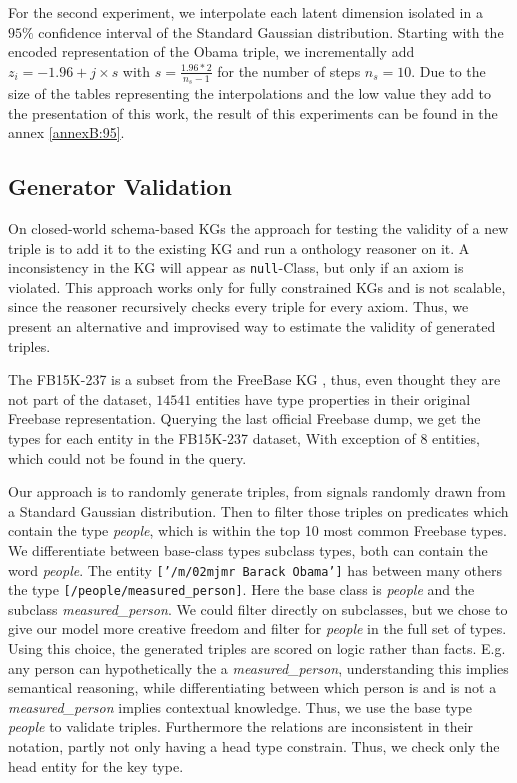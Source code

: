 For the second experiment, we interpolate each latent dimension isolated in a $95\%$ confidence interval of the Standard Gaussian distribution. Starting with the encoded representation of the Obama triple, we incrementally add $z_{i} = -1.96 + j \times s$ with $s = \frac{1.96 * 2}{n_s-1}$ for the number of steps $n_s = 10$. Due to the size of the tables representing the interpolations and the low value they add to the presentation of this work, the result of this experiments can be found in the annex \ref{annexB:95}.





\subsection{Generator Validation}
\label{ssec5:syntax}

On closed-world schema-based KGs the approach for testing the validity of a new triple is to add it to the existing KG and run a onthology reasoner on it. A inconsistency in the KG will appear as \texttt{null}-Class, but only if an axiom is violated. This approach works only for fully constrained KGs and is not scalable, since the reasoner recursively checks every triple for every axiom. Thus, we present an alternative and improvised way to estimate the validity of generated triples.

The FB15K-237 is a subset from the FreeBase KG \cite{bollacker_freebase_2008}, thus, even thought they are not part of the dataset, $14541$ entities have type properties in their original Freebase representation. 
Querying the last official Freebase dump, we get the types for each entity in the FB15K-237 dataset, With exception of $8$ entities, which could not be found in the query.

Our approach is to randomly generate triples, from signals randomly drawn from a Standard Gaussian distribution. Then to filter those triples on predicates which contain the type \textit{people}, which is within the top 10 most common Freebase types. We differentiate between base-class types subclass types, both can contain the word \textit{people}. The entity \texttt{['/m/02mjmr Barack Obama']} has between many others the type \texttt{[/people/measured\_person]}. Here the base class is \textit{people} and the subclass \textit{measured\_person}. We could filter directly on subclasses, but we chose to give our model more creative freedom and filter for \textit{people} in the full set of types. Using this choice, the generated triples are scored on logic rather than facts. E.g. any person can hypothetically the a \textit{measured\_person}, understanding this implies semantical reasoning, while differentiating between which person is and is not a \textit{measured\_person} implies contextual knowledge. Thus, we use the base type \textit{people} to validate triples.
Furthermore the relations are inconsistent in their notation, partly not only having a head type constrain. Thus, we check only the head entity for the key type. 

